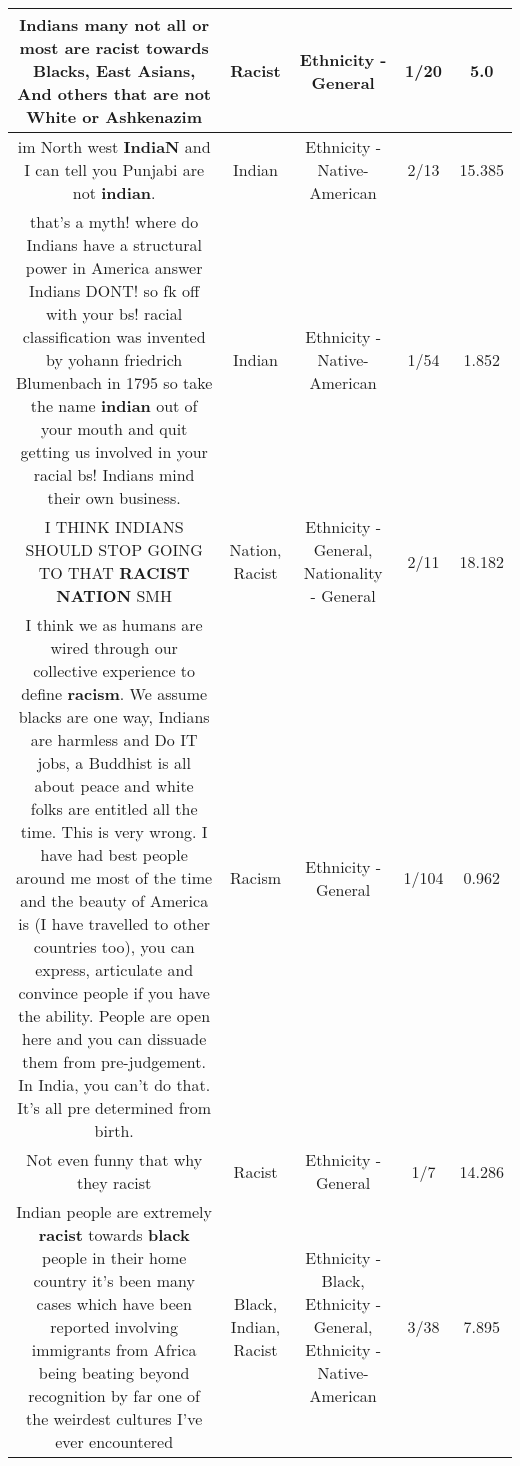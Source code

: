 \documentclass[11pt]{article}
\newlength\mylength
\begin{document}
\begin{center}
\begin{longtable}{|C{.65\mylength}|C{.30\mylength}|C{.12\mylength}|C{.12\mylength}|C{.12\mylength}|}
  \small Indians many not all or most are \textbf{racist} towards Blacks, East Asians, And others that are not White or Ashkenazim\normalsize   & Racist & Ethnicity - General & 1/20 & 5.0 \\  \hline
  \small im North west \textbf{IndiaN} and I can tell you Punjabi are not \textbf{indian}.\normalsize   & Indian & Ethnicity - Native-American & 2/13 & 15.385 \\  \hline
  \small that's a myth! where do Indians have a structural power in America answer Indians DONT! so fk off with your bs! racial classification was invented by yohann friedrich Blumenbach in 1795 so take the name \textbf{indian} out of your mouth and quit getting us involved in your racial bs! Indians mind their own business.\normalsize   & Indian & Ethnicity - Native-American & 1/54 & 1.852 \\  \hline
  \small I THINK INDIANS SHOULD STOP GOING TO THAT \textbf{RACIST} \textbf{NATION} SMH\normalsize   & Nation, Racist & Ethnicity - General, Nationality - General & 2/11 & 18.182 \\  \hline
  \small I think we as humans are wired through our collective experience to define \textbf{racism}. We assume blacks are one way, Indians are harmless and Do IT jobs, a Buddhist is all about peace and white folks are entitled all the time. This is very wrong. I have had best people around me most of the time and the beauty of America is (I have travelled to other countries too), you can express, articulate and convince people if you have the ability. People are open here and you can dissuade them from pre-judgement. In India, you can't do that. It's all pre determined from birth.\normalsize   & Racism & Ethnicity - General & 1/104 & 0.962 \\  \hline
  \small Not even funny that why they racist\normalsize   & Racist & Ethnicity - General & 1/7 & 14.286 \\  \hline
  \small Indian people are extremely \textbf{racist} towards \textbf{black} people in their home country it's been many cases which have been reported involving immigrants from Africa being beating beyond recognition by far one of the weirdest cultures I've ever encountered\normalsize   & Black, Indian, Racist & Ethnicity - Black, Ethnicity - General, Ethnicity - Native-American & 3/38 & 7.895 \\  \hline

\end{longtable}
\end{center}
\end{document}
